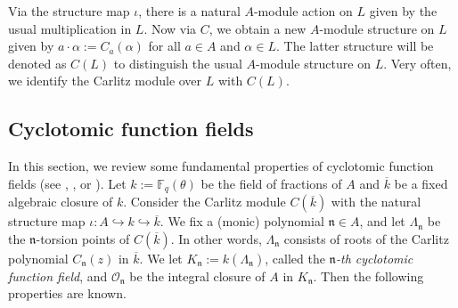\documentclass[11pt]{amsart}
\theoremstyle{plain}
\theoremstyle{definition}
\theoremstyle{remark}
\numberwithin{equation}{section}
\newcommand{\FF}{\mathbb{F}}
\newcommand{\nfk}{\mathfrak{n}}
\newcommand{\Ocal}{\mathcal{O}}
\newcommand{\ovl}{\overline}
\newcommand{\inj}{\hookrightarrow}
\newcommand{\Fq}{\FF_q}
\newcommand{\T}{\theta}
\begin{document}
	Via the structure map $\iota$, there is a natural $A$-module action on $L$ given by the usual multiplication in $L$.
	Now via $C$, we obtain a new $A$-module structure on $L$ given by $a \cdot \alpha := C_a(\alpha)$ for all $a\in A$ and $\alpha \in L$.
	The latter structure will be denoted as $C(L)$ to distinguish the usual $A$-module structure on $L$.
	Very often, we identify the Carlitz module over $L$ with $C(L)$.
	
	\subsection{Cyclotomic function fields}   \label{section-cyclotomic-function-fields}
	
	In this section, we review some fundamental properties of cyclotomic function fields (see \cite{hayes1974explicit}, \cite[Chapter 12]{rosen2002number}, or \cite[Section 7.1]{papikian2023drinfeld}).
	Let $k := \Fq(\T)$ be the field of fractions of $A$ and $\ovl{k}$ be a fixed algebraic closure of $k$.
	Consider the Carlitz module $C(\ovl{k})$ with the natural structure map $\iota: A \inj k \inj \ovl{k}$.
	We fix a (monic) polynomial $\nfk \in A$, and	let $\Lambda_\nfk$ be the $\nfk$-torsion points of $C(\ovl{k})$.
	In other words, $\Lambda_\nfk$ consists of roots of the Carlitz polynomial $C_\nfk(z)$ in $\ovl{k}$.
	We let $K_\nfk := k(\Lambda_\nfk)$, called the \textit{$\nfk$-th cyclotomic function field}, and $\Ocal_\nfk$ be the integral closure of $A$ in $K_\nfk$.
	Then the following properties are known.
	
\end{document}
